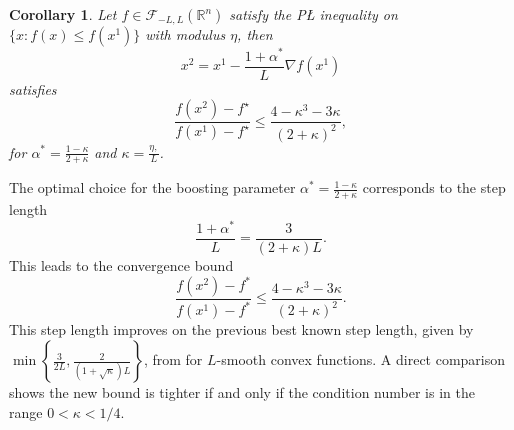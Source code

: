\documentclass{article} %
\newtheorem{corollary}{Corollary}
\renewcommand{\leq}{\leqslant}
\begin{document}
\begin{corollary}\label{cor:GD PL opt}
Let $f\in\mathcal{F}_{-L, L}({\mathbb{R}^n})$ satisfy the P{\L} inequality on $\{x: f(x)\leq f(x^1)\}$ with modulus $\eta$, then
\[
x^2 = x^1 - \frac{1 + \alpha^*}{L}\nabla f(x^1)
\]
satisfies
\[
\frac{f(x^2)-f^\star}{f(x^1)-f^\star}\leq \frac{4-\kappa^3 - 3\kappa}{(2+\kappa)^2},
\]
for $\alpha^* = \frac{1-\kappa}{2+\kappa}$ and $\kappa=\frac{\eta,}{L}$.
\end{corollary}
The optimal choice for the boosting parameter $\alpha^* = \frac{1-\kappa}{2+\kappa}$ corresponds to the step length
\[
\frac{1+\alpha^*}{L} = \frac{3}{(2+\kappa)L}.
\]
This leads to the convergence bound
\[
\frac{f(x^2)-f^*}{f(x^1)-f^*} \le \frac{4-\kappa^3-3\kappa}{(2+\kappa)^2}.
\]
This step length improves on the previous best known step length, given by $\min\left\{\frac{3}{2L}, \frac{2}{(1+\sqrt{\kappa})L}\right\}$,
 from \cite[Corollary 1]{abbaszadehpeivasti2022PL}
 for {$L$-smooth convex functions}.
 A direct comparison shows the new bound is tighter if and only if the condition number is in the range $0 < \kappa < 1/4$.
\end{document}
